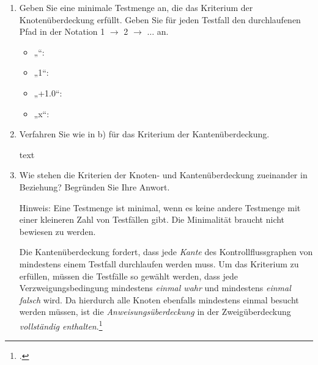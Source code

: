 \documentclass{lehramt-informatik-aufgabe}
\begin{document}
\begin{enumerate}

\item Geben Sie eine minimale Testmenge an, die das Kriterium der
Knotenüberdeckung erfüllt. Geben Sie für jeden Testfall den
durchlaufenen Pfad in der Notation 1 $\rightarrow$ 2 $\rightarrow$
$\dots$ an.

\begin{liAntwort}
\begin{itemize}
\item „“: \\

\item „1“:\\

\item „+1.0“:\\

\item „x“:\\
\end{itemize}
\end{liAntwort}


\item Verfahren Sie wie in b) für das Kriterium der Kantenüberdeckung.

\begin{liAntwort}
text
\end{liAntwort}


\item Wie stehen die Kriterien der Knoten- und Kantenüberdeckung
zueinander in Beziehung? Begründen Sie Ihre Anwort.

Hinweis: Eine Testmenge ist minimal, wenn es keine andere Testmenge mit
einer kleineren Zahl von Testfällen gibt. Die Minimalität braucht nicht
bewiesen zu werden.

\begin{liAntwort}
Die Kantenüberdeckung fordert, dass jede \emph{Kante} des
Kontrollflussgraphen von mindestens einem Testfall durchlaufen werden
muss. Um das Kriterium zu erfüllen, müssen die Testfälle so gewählt
werden, dass jede Verzweigungsbedingung mindestens \emph{einmal wahr}
und mindestens \emph{einmal falsch} wird. Da hierdurch alle Knoten
ebenfalls mindestens einmal besucht werden müssen, ist die
\emph{Anweisungsüberdeckung} in der Zweigüberdeckung \emph{vollständig
enthalten}.\footcite[Seite 209]{hoffmann:software}
\end{liAntwort}

\end{enumerate}
\end{document}

